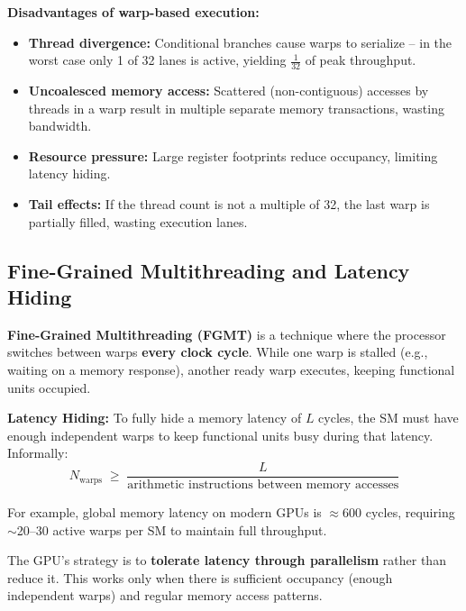 \begin{theorem}
    \textbf{Disadvantages of warp-based execution:}
    \begin{itemize}
        \item \textbf{Thread divergence:} Conditional branches cause warps to serialize -- in the worst case only 1 of 32 lanes is active, yielding $\frac{1}{32}$ of peak throughput.
        \item \textbf{Uncoalesced memory access:} Scattered (non-contiguous) accesses by threads in a warp result in multiple separate memory transactions, wasting bandwidth.
        \item \textbf{Resource pressure:} Large register footprints reduce occupancy, limiting latency hiding.
        \item \textbf{Tail effects:} If the thread count is not a multiple of 32, the last warp is partially filled, wasting execution lanes.
    \end{itemize}
\end{theorem}


\subsection{Fine-Grained Multithreading and Latency Hiding}

\begin{definition}
    \textbf{Fine-Grained Multithreading (FGMT)} is a technique where the processor switches between warps \textbf{every clock cycle}. While one warp is stalled (e.g., waiting on a memory response), another ready warp executes, keeping functional units occupied.
\end{definition}


\begin{theorem}
    \textbf{Latency Hiding:} To fully hide a memory latency of $L$ cycles, the SM must have enough independent warps to keep functional units busy during that latency. Informally:
    $$N_{\text{warps}} \;\geq\; \frac{L}{\text{arithmetic instructions between memory accesses}}$$
\end{theorem}

\begin{example}
        For example, global memory latency on modern GPUs is $\approx 600$ cycles, requiring $\sim$20--30 active warps per SM to maintain full throughput.
\end{example}

\begin{important}
    The GPU's strategy is to \textbf{tolerate latency through parallelism} rather than reduce it. This works only when there is sufficient occupancy (enough independent warps) and regular memory access patterns.
\end{important}


